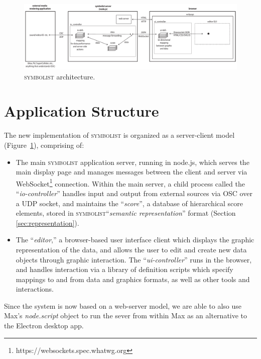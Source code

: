\documentclass{article}
\def\symbolist{\textsc{symbolist}\xspace}
\def\uicontroller{\textit{ui-controller}\xspace}
\def\iocontroller{\textit{io-controller}\xspace}
\begin{document}
\begin{figure}[ht!]
\centering
\includegraphics[width=2\columnwidth]{symbolist-architecture2.pdf}
\caption{ \symbolist architecture.
\label{fig:architecture}}
\end{figure}

\section{Application Structure}\label{sec:application_structure}

The new implementation of \symbolist is organized as a server-client model (Figure~\ref{fig:architecture}), comprising of:

\begin{itemize}\itemsep0pt 

\item The main \symbolist application server, running in node.js, which serves the main display page and manages messages between the client and server via WebSocket\footnote{https://websockets.spec.whatwg.org} connection. 
Within the main server, a child process called the ``\iocontroller''  handles input and output from external sources via OSC over a UDP socket, and maintains the ``\textit{score}'', a database of hierarchical score elements, stored in \symbolist ``\textit{semantic representation}'' format (Section \ref{sec:representation}).

\item The ``\textit{editor},'' a browser-based user interface client which displays the graphic representation of the data, and allows the user to edit and create new data objects through graphic interaction. The ``\uicontroller'' runs in the browser, and handles interaction via a library of definition scripts which specify mappings to and from data and graphics formats, as well as other tools and interactions.


\end{itemize}

Since the system is now based on a web-server model, we are able to also use Max's \textit{node.script} object to run the sever from within Max as an alternative to the Electron desktop app.
%
%
\end{document}
